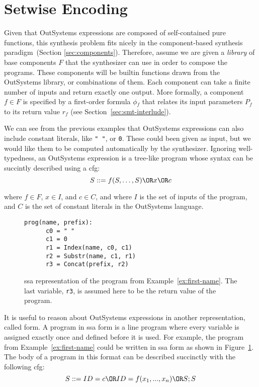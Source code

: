 \section{Setwise Encoding}
\label{sec:setwise-encoding}

Given that OutSystems expressions are composed of self-contained pure functions,
this synthesis problem fits nicely in the component-based synthesis
paradigm~(Section \ref{sec:components}). Therefore, assume we are given a
\textit{library} of base components $F$ that the synthesizer can use in order to
compose the programs. These components will be builtin functions drawn from the
OutSystems library, or combinations of them. Each component can take a finite
number of inputs and return exactly one output.
More formally, a component $f \in F$ is specified by a first-order formula
$\phi{}_f$ that relates its input parameters $P_f$ to its return value $r_f$
(see Section~\ref{sec:smt-interlude}).

We can see from the previous examples that OutSystems expressions can also
include constant literals, like \lstinline{" "}, or \lstinline{0}. These could
been given as input, but we would like them to be computed automatically
by the synthesizer. Ignoring well-typedness, an OutSystems expression is a
tree-like program whose syntax can be succintly described using a \gls{cfg}:
%
\[S ::= f(S, \ldots, S) \OR x \OR c\]

\noindent
where $f \in F$, $x \in I$, and $c \in C$, and where $I$ is the set of inputs of
the program, and $C$ is the set of constant literals in the OutSystems language.

\begin{figure}
  \begin{lstlisting}[frame=tlrb]
    prog(name, prefix):
      c0 = " "
      c1 = 0
      r1 = Index(name, c0, c1)
      r2 = Substr(name, c1, r1)
      r3 = Concat(prefix, r2)
  \end{lstlisting}
\caption{\Gls{ssa} representation of the program from
    Example~\ref{ex:first-name}. The last variable, \lstinline{r3}, is assumed
    here to be the return value of the program.}
\label{fig:first-name-ssa}
\end{figure}

It is useful to reason about OutSystems expressions in another representation,
called  form.
A program in \gls{ssa} form is a line program where every variable is assigned
exactly once and defined before it is used.
For example, the program from Example~\ref{ex:first-name} could be written in
\gls{ssa} form as shown in Figure~\ref{fig:first-name-ssa}.
The body of a program in this format can be described succinctly with the
following \gls{cfg}:
%
\[S ::= ID = c \OR ID = f(x_1, ..., x_n) \OR S;S\]

